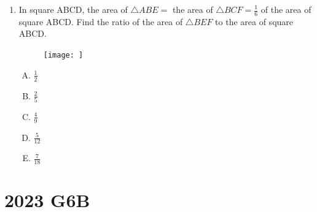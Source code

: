 \documentclass[12pt]{scrartcl}
\begin{document}
\begin{enumerate}
    \item In square ABCD, the area of $\triangle ABE = $ the area of $\triangle BCF = \frac{1}{6}$ of the area of square ABCD. Find the ratio of the area of $\triangle BEF$ to the area of square ABCD.
    \begin{figure}[h]
        \centering
        \texttt{[image: ]}
    \end{figure}
    \begin{multicols}{5}
        \begin{enumerate}[(A)]
            \item $\frac{1}{2}$
            \item $\frac{2}{5}$
            \item $\frac{4}{9}$
            \item $\frac{5}{12}$
            \item $\frac{7}{18}$
        \end{enumerate}
    \end{multicols}
\end{enumerate}


\section{2023 G6B}
\end{document}

